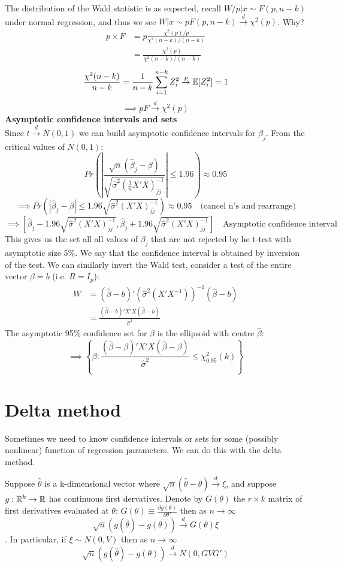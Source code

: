 \documentclass[DIV=14,titlepage=false]{scrreprt}
\begin{document}
The distribution of the Wald statistic is as expected, recall $W/p |x \sim F (p,n-k)$ under normal regression, and thus we see $W|x \sim pF (p,n-k) \overset{d}{\to} \chi^2(p)$. Why?
\begin{align*}
    p\times F &= p\frac{\chi^2(p)/p}{\chi^2(n-k)/(n-k)}\\
    &= \frac{\chi^2(p)}{\chi^2(n-k)/(n-k)}
\end{align*}
\[
    \frac{\chi^2(n-k)}{n-k} = \frac{1}{n-k}\sum_{i=1}^{n-k}Z_i^2 \overset{p}{\to} \mathbb{E}[Z_i^2]= 1
\]
\[
\implies pF \overset{d}{\to} \chi^2(p)    
\]
\textbf{Asymptotic confidence intervals and sets}\\
Since $t \overset{d}{\to} N(0,1)$ we can build asymptotic confidence intervals for $\beta_j$. From the critical values of $N(0,1)$:\[
Pr \left(\left|\frac{\sqrt{n}(\hat\beta_j-\beta)}{\sqrt{\hat\sigma^2 (\frac{1}{n} X' X)^{-1}_{jj}}}\right| \leq 1.96 \right) \approx 0.95\]
\[ \implies Pr \left(\left|\hat\beta_j-\beta\right|\leq 1.96{\sqrt{\hat\sigma^2 (X' X)^{-1}_{jj}}} \right) \approx 0.95 \quad \text{(cancel n's and rearrange)}
\]
\[ \implies \left[\hat\beta_j - 1.96 \sqrt{\hat\sigma^2 (X' X)^{-1}_{jj}}, \hat\beta_j + 1.96 \sqrt{\hat\sigma^2 (X' X)^{-1}_{jj}} \right] \quad \text{Asymptotic confidence interval}
\]
This gives us the set all all values of $\beta_j$ that are not rejected by he t-test with asymptotic size 5\%. We say that the confidence interval is obtained by inversion of the test. We can similarly invert the Wald test, consider a test of the entire vector $\beta = b$ (i.e. $R=I_p$):
\begin{align*}
    W &= (\hat \beta - b)'(\hat\sigma^2 (X'X^{-1}))^{-1}(\hat \beta - b)\\
    &= \frac{(\hat \beta - b)'X'X(\hat \beta - b)}{\hat\sigma^2}
\end{align*}
The asymptotic 95\% confidence set for $\beta$ is the ellipsoid with centre $\hat \beta$:
    \[ \implies \left\{ \beta : \frac{(\hat \beta - \beta)'X'X(\hat \beta - \beta)}{\hat\sigma^2} \leq \chi^2_{0.95}(k) \right\} \]

\section{Delta method}
Sometimes we need to know confidence intervals or sets for some (possibly nonlinear) function of regression parameters. We can do this with the delta method.

\begin{definition}
    Suppose $\hat \theta$ is a k-dimensional vector where $\sqrt{n}(\hat\theta - \theta) \overset{d}{\to} \xi$, and suppose $g: \mathbb{R}^k \to \mathbb{R}$ has continuous first dervatives. Denote by $G(\theta)$ the $r \times k$ matrix of first derivatives evaluated at $\theta$: $G(\theta)\equiv\frac{\partial g(\theta)}{\partial \theta'}$ then as $n\to \infty$ \[ \sqrt{n} (g(\hat \theta ) - g(\theta)) \overset{d}{\to} G(\theta) \xi \] . In particular, if $\xi \sim N(0,V)$ then as $n\to \infty$ \[ \sqrt{n} (g(\hat \theta ) - g(\theta)) \overset{d}{\to} N(0,GVG') \]
\end{definition}
\end{document}
